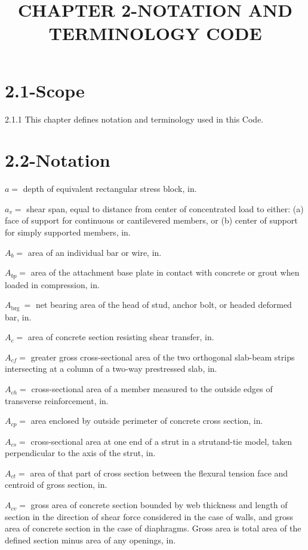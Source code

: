 \documentclass[10pt]{article}
\title{CHAPTER 2-NOTATION AND TERMINOLOGY CODE }
\author{}
\date{}
\begin{document}
\maketitle
\section*{2.1-Scope}
2.1.1 This chapter defines notation and terminology used in this Code.

\section*{2.2-Notation}
$a=$ depth of equivalent rectangular stress block, in.

$a_{v}=$ shear span, equal to distance from center of concentrated load to either: (a) face of support for continuous or cantilevered members, or (b) center of support for simply supported members, in.

$A_{b}=$ area of an individual bar or wire, in.  

$A_{b p}=$ area of the attachment base plate in contact with concrete or grout when loaded in compression, in.  

$A_{\text {brg }}=$ net bearing area of the head of stud, anchor bolt, or headed deformed bar, in.  

$A_{c}=$ area of concrete section resisting shear transfer, in.  

$A_{c f}=$ greater gross cross-sectional area of the two orthogonal slab-beam strips intersecting at a column of a two-way prestressed slab, in.  

$A_{c h}=$ cross-sectional area of a member measured to the outside edges of transverse reinforcement, in.  

$A_{c p}=$ area enclosed by outside perimeter of concrete cross section, in.  

$A_{c s}=$ cross-sectional area at one end of a strut in a strutand-tie model, taken perpendicular to the axis of the strut, in.  

$A_{c t}=$ area of that part of cross section between the flexural tension face and centroid of gross section, in.  

$A_{c v}=$ gross area of concrete section bounded by web thickness and length of section in the direction of shear force considered in the case of walls, and gross area of concrete section in the case of diaphragms. Gross area is total area of the defined section minus area of any openings, in.  
\end{document}
